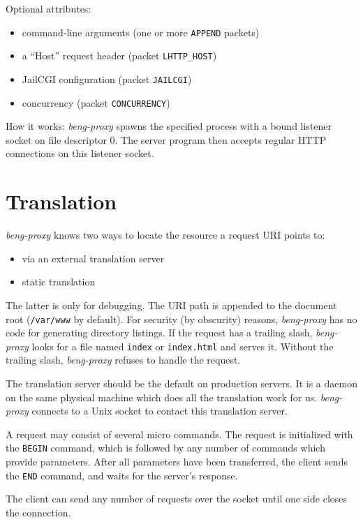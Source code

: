 \documentclass[a4paper,12pt]{article}
\begin{document}
Optional attributes:

\begin{itemize}
\item command-line arguments (one or more \verb|APPEND| packets)
\item a ``Host'' request header (packet \verb|LHTTP_HOST|)
\item JailCGI configuration (packet \verb|JAILCGI|)
\item concurrency (packet \verb|CONCURRENCY|)
\end{itemize}

How it works: \emph{beng-proxy} spawns the specified process with a
bound listener socket on file descriptor 0.  The server program then
accepts regular HTTP connections on this listener socket.

\section{Translation}

\emph{beng-proxy} knows two ways to locate the resource a request URI
points to:

\begin{itemize}
\item via an external translation server
\item static translation
\end{itemize}

The latter is only for debugging.  The URI path is appended to the
document root (\texttt{/var/www} by default).  For security (by
obscurity) reasons, \emph{beng-proxy} has no code for generating
directory listings.  If the request has a trailing slash,
\emph{beng-proxy} looks for a file named \texttt{index} or
\texttt{index.html} and serves it.  Without the trailing slash,
\emph{beng-proxy} refuses to handle the request.

The translation server should be the default on production servers.
It is a daemon on the same physical machine which does all the
translation work for us.  \emph{beng-proxy} connects to a Unix socket
to contact this translation server.

A request may consist of several micro commands.  The request is
initialized with the \texttt{BEGIN} command, which is followed by any
number of commands which provide parameters.  After all parameters
have been transferred, the client sends the \texttt{END} command,
and waits for the server's response.

The client can send any number of requests over the socket until one
side closes the connection.
\end{document}
